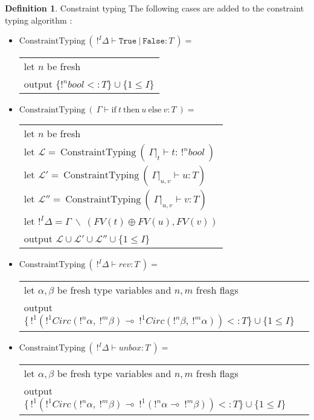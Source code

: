 \documentclass[10pt]{article}
\theoremstyle{plain}
\theoremstyle{definition}
\newtheorem{defn}{Definition}[subsection] %
\begin{document}
\begin{defn}{Constraint typing}
	The following cases are added to the constraint typing algorithm :
	\begin{itemize}
		\item $\text{ConstraintTyping} ~ (~ !^I \Delta \vdash \texttt{True} ~|~ \texttt{False} : T ~) = $ \\
		  \begin{tabular}{l}
		  	let $n$ be fresh \\
				output $\{ !^n bool <: T \} \cup \{ 1 \le I \}$
		  \end{tabular}
		
		\item $\text{ConstraintTyping} ~ (~ \Gamma \vdash \text{if}~ t ~\text{then}~ u ~\text{else}~ v : T ~) = $ \\
			\begin{tabular}{l}
				let $n$ be fresh \\
				let $\mathcal{L} = ~ \text{ConstraintTyping} ~ (~ \Gamma|_t \vdash t : \, !^nbool ~)$ \\
				let $\mathcal{L'} = ~ \text{ConstraintTyping} ~ ( ~ \Gamma|_{u, v} \vdash u : T)$ \\
				let $\mathcal{L''} = ~ \text{ConstraintTyping} ~ ( ~ \Gamma|_{u, v} \vdash v : T)$ \\
				let $!^I\Delta = \Gamma ~ \backslash ~ (FV(t) \oplus FV(u), FV(v))$ \\
				output $\mathcal{L \cup L' \cup L''} \cup \{ 1 \le I \}$
			\end{tabular}

		\item $\text{ConstraintTyping} ~ (~ !^I \Delta \vdash rev : T ~) = $ \\
		  \begin{tabular}{l}
		  	let $\alpha, \beta$ be fresh type variables and $n, m$ fresh flags \\
				output $\{ \,!^1 (!^1Circ (!^n\alpha, ~!^m\beta) \multimap ~!^1Circ (!^n\beta, ~!^m\alpha)) <: T \} \cup \{ 1 \le I \}$
		  \end{tabular}
		  
		\item $\text{ConstraintTyping} ~ (~ !^I \Delta \vdash unbox : T ~) = $ \\
		  \begin{tabular}{l}
		  	let $\alpha, \beta$ be fresh type variables and $n, m$ fresh flags \\
				output $\{ \,!^1 (!^1Circ (!^n\alpha, ~!^m\beta) \multimap ~!^1(!^n\alpha \multimap ~!^m\beta)) <: T \} \cup \{ 1 \le I \}$
		  \end{tabular}


\end{itemize}
\end{defn}
\end{document}
